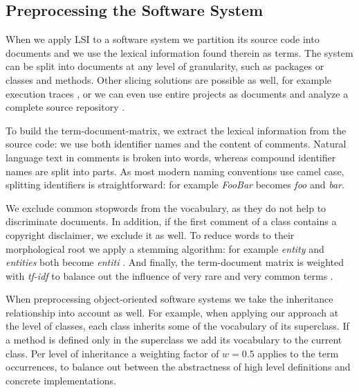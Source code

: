 
\subsection{Preprocessing the Software System}\label{sec:parsing}

When we apply LSI to a software system we partition its source code into documents and we use the lexical information found therein as terms. The system can be split into documents at any level of granularity, such as packages or classes and methods. Other slicing solutions are possible as well, for example execution traces \cite{Kuhn05b}, or we can even use entire projects as documents and analyze a complete source repository \cite{Kawa04a}.

To build the term-document-matrix, we extract the lexical information from the source code: we use both identifier names and the content of comments. Natural language text in comments is broken into words, whereas compound identifier names are split into parts. As most modern naming conventions use camel case, splitting identifiers is straightforward: for example \emph{FooBar} becomes \emph{foo} and \emph{bar}.

We exclude common stopwords from the vocabulary, as they do not help to discriminate documents. In addition, if the first comment of a class contains a copyright disclaimer, we exclude it as well. To reduce words to their morphological root we apply a stemming algorithm: for example \emph{entity} and \emph{entities} both become \emph{entiti} \cite{Port80a}. And finally, the term-document matrix is weighted with \emph{tf-idf} to balance out the influence of very rare and very common terms \cite{Duma91a}.

When preprocessing object-oriented software systems we take the inheritance relationship into account as well. For example, when applying our approach at the level of classes, each class inherits some of the vocabulary of its superclass. If a method is defined only in the superclass we add its vocabulary to the current class. Per level of inheritance a weighting factor of $w = 0.5$ applies to the term occurrences, to balance out between the abstractness of high level definitions and concrete implementations.

